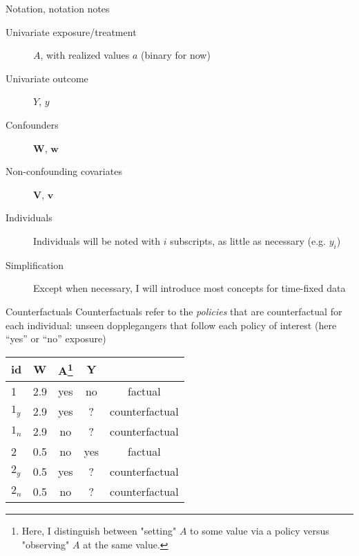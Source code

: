 \title{}
\subtitle{Foundational concepts}
\author{
	\begin{itemize}
		\item Counterfactuals
		\item Potential outcomes and consistency
		\item Causal identification assumptions
	\end{itemize}
}
\date{}
\begin{frame}
	\titlepage
\end{frame}

\begin{frame}{Notation, notation notes}
	\begin{description}
		\item[Univariate exposure/treatment] $A$, with realized values $a$ (binary for now)
		\item[Univariate outcome] $Y$, $y$
		\item[Confounders] $\bm{W}$, $\bm{w}$
		\item[Non-confounding covariates] $\bm{V}$, $\bm{v}$
		\item[Individuals] Individuals will be noted with $i$ subscripts, as little as necessary (e.g. $y_{i}$)
		\item[Simplification] Except when necessary, I will introduce most concepts for time-fixed data
	\end{description}
\end{frame}



\begin{frame}[c]{Counterfactuals}
Counterfactuals refer to the \emph{policies} that are counterfactual for each individual: unseen dopplegangers that follow each policy of interest (here ``yes'' or ``no'' exposure)

		\begin{center}
			\begin{tabular}{lcccc}\hline
				id      & W   & A\footnote{Here, I distinguish between "setting" $A$ to some value via a policy versus "observing" $A$ at the same value.}   & Y   &  \\\hline
				1       & 2.9 & yes & no  & factual     \\
				$1_{y}$ & 2.9 & yes & ?   & counterfactual      \\
				$1_{n}$ & 2.9 & no  & ?   & counterfactual      \\
				2       & 0.5 & no  & yes & factual     \\
				$2_y$   & 0.5 & yes & ?   & counterfactual      \\
				$2_n$   & 0.5 & no  & ?   & counterfactual      \\
				\hline
			\end{tabular}
		\end{center}

\end{frame}

